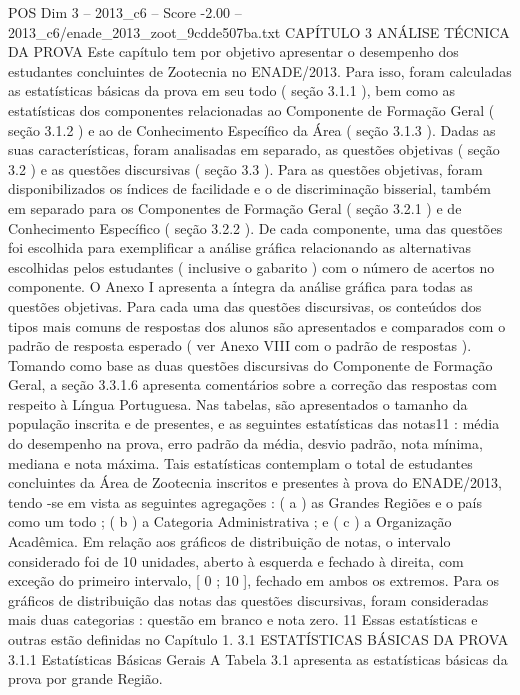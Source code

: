 \begin{textsample}{POS Dim 3 – 2013\_c6 – Score -2.00 – 2013\_c6/enade\_2013\_zoot\_9cdde507ba.txt}  \label{ex:f3_pos_230}
CAPÍTULO 3 ANÁLISE TÉCNICA DA PROVA Este capítulo tem por objetivo apresentar o desempenho dos estudantes concluintes de Zootecnia no ENADE/2013.
Para isso, foram calculadas as estatísticas básicas da prova em seu todo ( seção 3.1.1 ), bem como as estatísticas dos componentes relacionadas ao Componente de Formação Geral ( seção 3.1.2 ) e ao de Conhecimento Específico da Área ( seção 3.1.3 ).
Dadas as suas características, foram analisadas em separado, as questões objetivas ( seção 3.2 ) e as questões discursivas ( seção 3.3 ).
Para as questões objetivas, foram disponibilizados os índices de facilidade e o de discriminação bisserial, também em separado para os Componentes de Formação Geral ( seção 3.2.1 ) e de Conhecimento Específico ( seção 3.2.2 ).
De cada componente, uma das questões foi escolhida para exemplificar a análise gráfica relacionando as alternativas escolhidas pelos estudantes ( inclusive o gabarito ) com o número de acertos no componente.
O Anexo I apresenta a íntegra da análise gráfica para todas as questões objetivas.
Para cada uma das questões discursivas, os conteúdos dos tipos mais comuns de respostas dos alunos são apresentados e comparados com o padrão de resposta esperado ( ver Anexo VIII com o padrão de respostas ).
Tomando como base as duas questões discursivas do Componente de Formação Geral, a seção 3.3.1.6 apresenta comentários sobre a correção das respostas com respeito à Língua Portuguesa.
Nas tabelas, são apresentados o tamanho da população inscrita e de presentes, e as seguintes estatísticas das notas11 : média do desempenho na prova, erro padrão da média, desvio padrão, nota mínima, mediana e nota máxima.
Tais estatísticas contemplam o total de estudantes concluintes da Área de Zootecnia inscritos e presentes à prova do ENADE/2013, tendo -se em vista as seguintes agregações : ( a ) as Grandes Regiões e o país como um todo ; ( b ) a Categoria Administrativa ; e ( c ) a Organização Acadêmica.
Em relação aos gráficos de distribuição de notas, o intervalo considerado foi de 10 unidades, aberto à esquerda e fechado à direita, com exceção do primeiro intervalo, [ 0 ; 10 ], fechado em ambos os extremos.
Para os gráficos de distribuição das notas das questões discursivas, foram consideradas mais duas categorias : questão em branco e nota zero. 11 Essas estatísticas e outras estão definidas no Capítulo 1. 3.1 ESTATÍSTICAS BÁSICAS DA PROVA 3.1.1 Estatísticas Básicas Gerais A Tabela 3.1 apresenta as estatísticas básicas da prova por grande Região.

\end{textsample}
